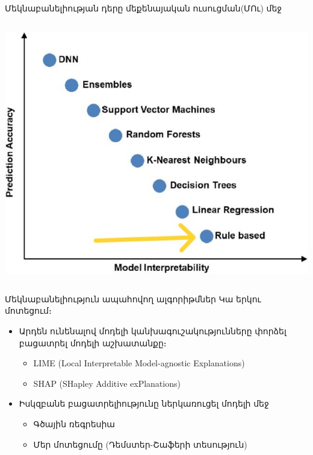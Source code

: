 \documentclass[aspectratio=169]{beamer}
\begin{document}
\begin{frame}{Մեկնաբանելիության դերը մեքենայական ուսուցման(ՄՈւ) մեջ}
\begin{columns}
\begin{column}{0.5\textwidth}
\begin{overprint}
        \includegraphics[width=\textwidth]{"../../fig/interp_over_power_accent.jpg"}
    \end{overprint}
\end{column}  
\end{columns}
\end{frame}

\begin{frame}{Մեկնաբանելիություն ապահովող ալգորիթմներ}
Կա երկու մոտեցում։
\begin{itemize}
    \item Արդեն ունենալով մոդելի կանխագուշակությունները փորձել բացատրել մոդելի աշխատանքը։ \pause
        \begin{itemize}
            \item \rm{LIME} (Local Interpretable Model-agnostic Explanations)
            \item SHAP (SHapley Additive exPlanations)
        \end{itemize}
    \pause
    \item Իսկզբանե բացատրելիությունը ներկառուցել մոդելի մեջ 
    \begin{itemize}
        \item Գծային ռեգրեսիա
        \item Մեր մոտեցումը (Դեմստեր-Շաֆերի տեսություն)
    \end{itemize}
\end{itemize}
\end{frame}
\end{document}

